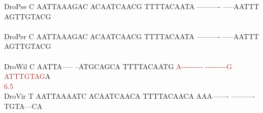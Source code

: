 \documentclass[11pt,twoside,reqno,a4paper]{article}
\begin{document}
{DroPse	C	AATTAAAGAC	ACAATCAACG	TTTTACAATA	----------	-----AATTT	AGTTGTACG\\
\hspace*{7\charwidth}\hspace*{1\charwidth}\hspace*{1\charwidth}\hspace*{1\charwidth}\hspace*{1\charwidth}\hspace*{1\charwidth}\hspace*{1\charwidth}\\
DroPer	C	AATTAAAGAC	ACAATCAACG	TTTTACAATA	----------	-----AATTT	AGTTGTACG\\
\hspace*{7\charwidth}\hspace*{1\charwidth}\hspace*{1\charwidth}\hspace*{1\charwidth}\hspace*{1\charwidth}\hspace*{1\charwidth}\hspace*{1\charwidth}\\
DroWil	C	AATTA-----	--ATGCAGCA	TTTTACAATG	\textcolor{Brown}{A}\textcolor{Brown}{-}\textcolor{Brown}{-}\textcolor{Brown}{-}\textcolor{Brown}{-}\textcolor{Brown}{-}\textcolor{Brown}{-}\textcolor{Brown}{-}\textcolor{Brown}{-}\textcolor{Brown}{-}	\textcolor{Brown}{-}\textcolor{Brown}{-}\textcolor{Brown}{-}\textcolor{Brown}{-}\textcolor{Brown}{-}\textcolor{Brown}{-}\textcolor{Brown}{-}\textcolor{Brown}{-}\textcolor{Brown}{-}\textcolor{Brown}{G}	\textcolor{Brown}{A}\textcolor{Brown}{T}\textcolor{Brown}{T}\textcolor{Brown}{T}\textcolor{Brown}{G}\textcolor{Brown}{T}\textcolor{Brown}{A}\textcolor{Brown}{G}A\\
\hspace*{7\charwidth}\hspace*{1\charwidth}\hspace*{1\charwidth}\hspace*{1\charwidth}\hspace*{1\charwidth}\hspace*{31\charwidth}\textcolor{Brown}{6.5}\hspace*{1\charwidth}\hspace*{1\charwidth}\\
DroVir	T	AATTAAAATC	ACAATCAACA	TTTTACAACA	AAA-------	----------	TGTA---CA\\
\hspace*{7\charwidth}\hspace*{1\charwidth}\hspace*{1\charwidth}\hspace*{1\charwidth}\hspace*{1\charwidth}\hspace*{1\charwidth}\hspace*{1\charwidth}\\
}
\end{document}
